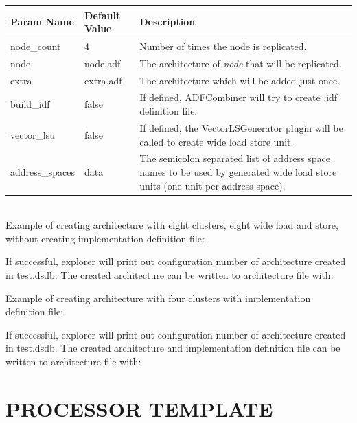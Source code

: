 \documentclass[twoside]{tceusermanual}
\begin{document}
\begin{tabular}{p{}p{}
                p{}}
\textbf{Param Name} &\textbf{Default Value} &\textbf{Description} \\
\hline
node\_count & 4 & Number of times the node is replicated. \\
node & node.adf & The architecture of \textit{node} that will be replicated. \\
extra & extra.adf & The architecture which will be added just once. \\
build\_idf & false & If defined, ADFCombiner will try to create .idf definition file. \\
vector\_lsu & false & If defined, the VectorLSGenerator plugin will be called to create wide load store unit. \\
address\_spaces & data & The semicolon separated list of address space names to be used by generated wide load store units (one unit per address space). \\ 
\end{tabular}\\

Example of creating architecture with eight clusters, eight wide load and store,  without creating implementation
definition file:


If successful, explorer will print out configuration number of architecture created in test.dsdb.
The created architecture can be written to architecture file with:


Example of creating architecture with four clusters with implementation
definition file:


If successful, explorer will print out configuration number of architecture created in test.dsdb.
The created architecture and implementation definition file can be written to architecture file with:



\chapter{PROCESSOR TEMPLATE}
\label{section:template}
\end{document}
